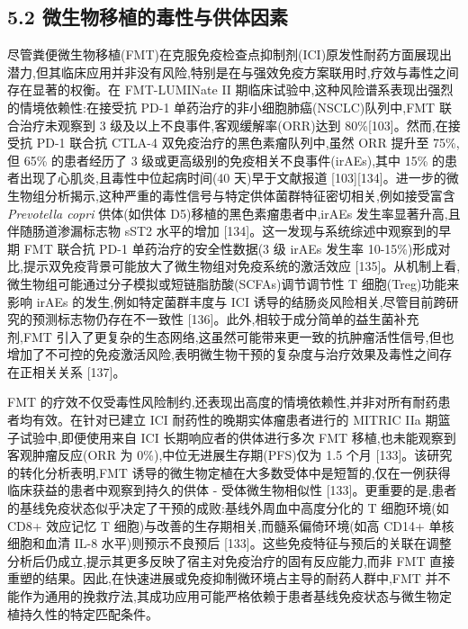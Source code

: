 \subsection{5.2 微生物移植的毒性与供体因素}\label{ux5faeux751fux7269ux79fbux690dux7684ux6bd2ux6027ux4e0eux4f9bux4f53ux56e0ux7d20}

尽管粪便微生物移植(FMT)在克服免疫检查点抑制剂(ICI)原发性耐药方面展现出潜力,但其临床应用并非没有风险,特别是在与强效免疫方案联用时,疗效与毒性之间存在显著的权衡。在 FMT-LUMINate II 期临床试验中,这种风险谱系表现出强烈的情境依赖性:在接受抗 PD-1 单药治疗的非小细胞肺癌(NSCLC)队列中,FMT 联合治疗未观察到 3 级及以上不良事件,客观缓解率(ORR)达到 80\%{[}103{]}。然而,在接受抗 PD-1 联合抗 CTLA-4 双免疫治疗的黑色素瘤队列中,虽然 ORR 提升至 75\%,但 65\% 的患者经历了 3 级或更高级别的免疫相关不良事件(irAEs),其中 15\% 的患者出现了心肌炎,且毒性中位起病时间(40 天)早于文献报道 {[}103{]}{[}134{]}。进一步的微生物组分析揭示,这种严重的毒性信号与特定供体菌群特征密切相关,例如接受富含 \emph{Prevotella copri} 供体(如供体 D5)移植的黑色素瘤患者中,irAEs 发生率显著升高,且伴随肠道渗漏标志物 sST2 水平的增加 {[}134{]}。这一发现与系统综述中观察到的早期 FMT 联合抗 PD-1 单药治疗的安全性数据(3 级 irAEs 发生率 10-15\%)形成对比,提示双免疫背景可能放大了微生物组对免疫系统的激活效应 {[}135{]}。从机制上看,微生物组可能通过分子模拟或短链脂肪酸(SCFAs)调节调节性 T 细胞(Treg)功能来影响 irAEs 的发生,例如特定菌群丰度与 ICI 诱导的结肠炎风险相关,尽管目前跨研究的预测标志物仍存在不一致性 {[}136{]}。此外,相较于成分简单的益生菌补充剂,FMT 引入了更复杂的生态网络,这虽然可能带来更一致的抗肿瘤活性信号,但也增加了不可控的免疫激活风险,表明微生物干预的复杂度与治疗效果及毒性之间存在正相关关系 {[}137{]}。

FMT 的疗效不仅受毒性风险制约,还表现出高度的情境依赖性,并非对所有耐药患者均有效。在针对已建立 ICI 耐药性的晚期实体瘤患者进行的 MITRIC IIa 期篮子试验中,即便使用来自 ICI 长期响应者的供体进行多次 FMT 移植,也未能观察到客观肿瘤反应(ORR 为 0\%),中位无进展生存期(PFS)仅为 1.5 个月 {[}133{]}。该研究的转化分析表明,FMT 诱导的微生物定植在大多数受体中是短暂的,仅在一例获得临床获益的患者中观察到持久的供体 - 受体微生物相似性 {[}133{]}。更重要的是,患者的基线免疫状态似乎决定了干预的成败:基线外周血中高度分化的 T 细胞环境(如 CD8+ 效应记忆 T 细胞)与改善的生存期相关,而髓系偏倚环境(如高 CD14+ 单核细胞和血清 IL-8 水平)则预示不良预后 {[}133{]}。这些免疫特征与预后的关联在调整分析后仍成立,提示其更多反映了宿主对免疫治疗的固有反应能力,而非 FMT 直接重塑的结果。因此,在快速进展或免疫抑制微环境占主导的耐药人群中,FMT 并不能作为通用的挽救疗法,其成功应用可能严格依赖于患者基线免疫状态与微生物定植持久性的特定匹配条件。

